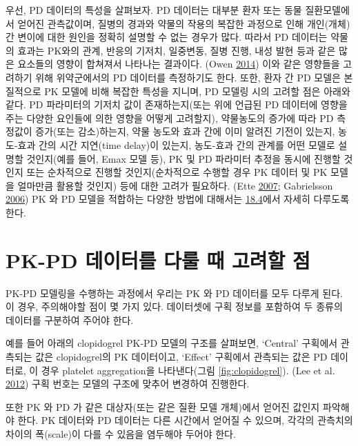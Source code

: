 \documentclass[
  11pt,
  krantz2,
  a4paper]{krantz}
\theoremstyle{definition}
\theoremstyle{definition}
\theoremstyle{definition}
\theoremstyle{remark}
\begin{document}
우선, PD 데이터의 특성을 살펴보자. PD 데이터는 대부분 환자 또는 동물 질환모델에서 얻어진 관측값이며, 질병의 경과와 약물의 작용의 복잡한 과정으로 인해 개인(개체) 간 변이에 대한 원인을 정확히 설명할 수 없는 경우가 많다. 따라서 PD 데이터는 약물의 효과는 PK와의 관계, 반응의 기저치, 일중변동, 질병 진행, 내성 발현 등과 같은 많은 요소들의 영향이 합쳐져서 나타나는 결과이다. (Owen \protect\hyperlink{ref-kelly}{2014}) 이와 같은 영향들을 고려하기 위해 위약군에서의 PD 데이터를 측정하기도 한다. 또한, 환자 간 PD 모델은 본질적으로 PK 모델에 비해 복잡한 특성을 지니며, PD 모델링 시의 고려할 점은 아래와 같다. PD 파라미터의 기저치 값이 존재하는지(또는 위에 언급된 PD 데이터에 영향을 주는 다양한 요인들에 의한 영향을 어떻게 고려할지), 약물농도의 증가에 따라 PD 측정값이 증가(또는 감소)하는지, 약물 농도와 효과 간에 이미 알려진 기전이 있는지, 농도-효과 간의 시간 지연(time delay)이 있는지, 농도-효과 간의 관계를 어떤 모델로 설명할 것인지(예를 들어, Emax 모델 등), PK 및 PD 파라미터 추정을 동시에 진행할 것인지 또는 순차적으로 진행할 것인지(순차적으로 수행할 경우 PK 데이터 및 PK 모델을 얼마만큼 활용할 것인지) 등에 대한 고려가 필요하다. (Ette \protect\hyperlink{ref-ette}{2007}; Gabrielsson \protect\hyperlink{ref-gabrielsson}{2006}) PK 와 PD 모델을 적합하는 다양한 방법에 대해서는 \protect\hyperlink{pkpd-link-method}{18.4}에서 자세히 다루도록 한다.

\hypertarget{pk-pd-uxb370uxc774uxd130uxb97c-uxb2e4uxb8f0-uxb54c-uxace0uxb824uxd560-uxc810}{%
\section{PK-PD 데이터를 다룰 때 고려할 점}\label{pk-pd-uxb370uxc774uxd130uxb97c-uxb2e4uxb8f0-uxb54c-uxace0uxb824uxd560-uxc810}}

PK-PD 모델링을 수행하는 과정에서 우리는 PK 와 PD 데이터를 모두 다루게 된다. 이 경우, 주의해야할 점이 몇 가지 있다. 데이터셋에 구획 정보를 포함하여 두 종류의 데이터를 구분하여 주어야 한다.

예를 들어 아래의 clopidogrel PK-PD 모델의 구조를 살펴보면, `Central' 구획에서 관측되는 값은 clopidogrel의 PK 데이터이고, `Effect' 구획에서 관측되는 값은 PD 데이터로, 이 경우 platelet aggregation을 나타낸다(그림 \ref{fig:clopidogrel}). (Lee et al. \protect\hyperlink{ref-lee2012population}{2012}) 구획 번호는 모델의 구조에 맞추어 변경하여 진행한다.

또한 PK 와 PD 가 같은 대상자(또는 같은 질환 모델 개체)에서 얻어진 값인지 파악해야 한다. PK 데이터와 PD 데이터는 다른 시간에서 얻어질 수 있으며, 각각의 관측치의 차이의 폭(scale)이 다를 수 있음을 염두해야 두어야 한다.
\end{document}

